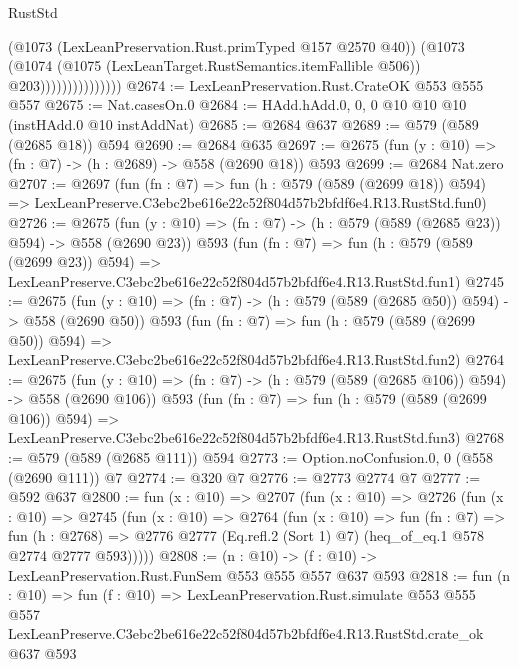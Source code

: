 \begin{lexlean}{RustStd}
\begin{coremodule}
                              (@1073 (LexLeanPreservation.Rust.primTyped @157 @2570 @40))
                              (@1073
                                (@1074
                                  (@1075 (LexLeanTarget.RustSemantics.itemFallible @506))
                                  @203)))))))))))))))
@2674 := LexLeanPreservation.Rust.CrateOK @553 @555 @557
@2675 := Nat.casesOn.{0}
@2684 := HAdd.hAdd.{0, 0, 0} @10 @10 @10 (instHAdd.{0} @10 instAddNat)
@2685 := @2684 @637
@2689 := @579 (@589 (@2685 @18)) @594
@2690 := @2684 @635
@2697 := @2675 (fun (y : @10) => (fn : @7) -> (h : @2689) -> @558 (@2690 @18)) @593
@2699 := @2684 Nat.zero
@2707 := @2697
    (fun (fn : @7) =>
    fun (h : @579 (@589 (@2699 @18)) @594) =>
    LexLeanPreserve.C3ebc2be616e22c52f804d57b2bfdf6e4.R13.RustStd.fun0)
@2726 := @2675
    (fun (y : @10) => (fn : @7) -> (h : @579 (@589 (@2685 @23)) @594) -> @558 (@2690 @23))
    @593
    (fun (fn : @7) =>
    fun (h : @579 (@589 (@2699 @23)) @594) =>
    LexLeanPreserve.C3ebc2be616e22c52f804d57b2bfdf6e4.R13.RustStd.fun1)
@2745 := @2675
    (fun (y : @10) => (fn : @7) -> (h : @579 (@589 (@2685 @50)) @594) -> @558 (@2690 @50))
    @593
    (fun (fn : @7) =>
    fun (h : @579 (@589 (@2699 @50)) @594) =>
    LexLeanPreserve.C3ebc2be616e22c52f804d57b2bfdf6e4.R13.RustStd.fun2)
@2764 := @2675
    (fun (y : @10) => (fn : @7) -> (h : @579 (@589 (@2685 @106)) @594) -> @558 (@2690 @106))
    @593
    (fun (fn : @7) =>
    fun (h : @579 (@589 (@2699 @106)) @594) =>
    LexLeanPreserve.C3ebc2be616e22c52f804d57b2bfdf6e4.R13.RustStd.fun3)
@2768 := @579 (@589 (@2685 @111)) @594
@2773 := Option.noConfusion.{0, 0} (@558 (@2690 @111)) @7
@2774 := @320 @7
@2776 := @2773 @2774 @7
@2777 := @592 @637
@2800 := fun (x : @10) =>
  @2707
    (fun (x : @10) =>
    @2726
      (fun (x : @10) =>
      @2745
        (fun (x : @10) =>
        @2764
          (fun (x : @10) =>
          fun (fn : @7) =>
          fun (h : @2768) =>
          @2776 @2777 (Eq.refl.{2} (Sort 1) @7) (heq_of_eq.{1} @578 @2774 @2777 @593)))))
@2808 := (n : @10) -> (f : @10) -> LexLeanPreservation.Rust.FunSem @553 @555 @557 @637 @593
@2818 := fun (n : @10) =>
  fun (f : @10) =>
  LexLeanPreservation.Rust.simulate
    @553
    @555
    @557
    LexLeanPreserve.C3ebc2be616e22c52f804d57b2bfdf6e4.R13.RustStd.crate_ok
    @637
    @593
\end{coremodule}
\end{lexlean}
